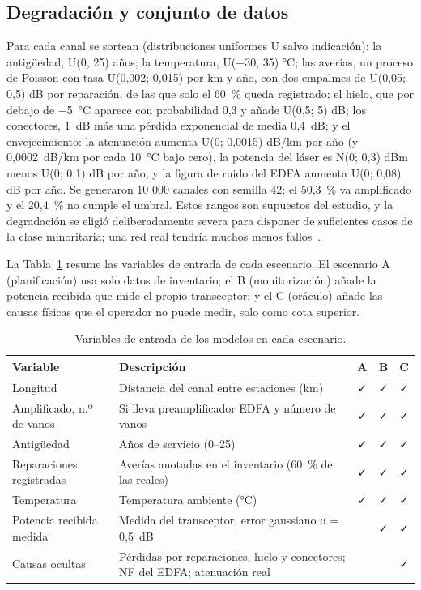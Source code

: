 \documentclass[runningheads]{llncs}
\begin{document}
\subsection{Degradación y conjunto de datos}

Para cada canal se sortean (distribuciones uniformes U salvo indicación): la antigüedad, U(0, 25) años; la temperatura, U(−30, 35) °C; las averías, un proceso de Poisson con tasa U(0,002; 0,015) por km y año, con dos empalmes de U(0,05; 0,5) dB por reparación, de las que solo el 60~\% queda registrado; el hielo, que por debajo de −5~°C aparece con probabilidad 0,3 y añade U(0,5; 5) dB; los conectores, 1~dB más una pérdida exponencial de media 0,4~dB; y el envejecimiento: la atenuación aumenta U(0; 0,0015) dB/km por año (y 0,0002~dB/km por cada 10~°C bajo cero), la potencia del láser es N(0; 0,3) dBm menos U(0; 0,1) dB por año, y la figura de ruido del EDFA aumenta U(0; 0,08) dB por año. Se generaron 10 000 canales con semilla 42; el 50,3~\% va amplificado y el 20,4~\% no cumple el umbral. Estos rangos son supuestos del estudio, y la degradación se eligió deliberadamente severa para disponer de suficientes casos de la clase minoritaria; una red real tendría muchos menos fallos~\cite{kozdrowski2021}.

La Tabla~\ref{tab:variables} resume las variables de entrada de cada escenario. El escenario A (planificación) usa solo datos de inventario; el B (monitorización) añade la potencia recibida que mide el propio transceptor; y el C (oráculo) añade las causas físicas que el operador no puede medir, solo como cota superior.

\begin{table}[htbp]
\centering
\footnotesize
\caption{Variables de entrada de los modelos en cada escenario.}
\label{tab:variables}
\begin{tabular}{>{\raggedright\arraybackslash}p{3.1cm}>{\raggedright\arraybackslash}p{5.4cm}ccc}
\toprule
Variable & Descripción & A & B & C \\
\midrule
Longitud & Distancia del canal entre estaciones (km) & ✓ & ✓ & ✓ \\
Amplificado, n.º de vanos & Si lleva preamplificador EDFA y número de vanos & ✓ & ✓ & ✓ \\
Antigüedad & Años de servicio (0–25) & ✓ & ✓ & ✓ \\
Reparaciones registradas & Averías anotadas en el inventario (60~\% de las reales) & ✓ & ✓ & ✓ \\
Temperatura & Temperatura ambiente (°C) & ✓ & ✓ & ✓ \\
Potencia recibida medida & Medida del transceptor, error gaussiano σ = 0,5~dB &  & ✓ & ✓ \\
Causas ocultas & Pérdidas por reparaciones, hielo y conectores; NF del EDFA; atenuación real &  &  & ✓ \\
\bottomrule
\end{tabular}
\end{table}
\end{document}

